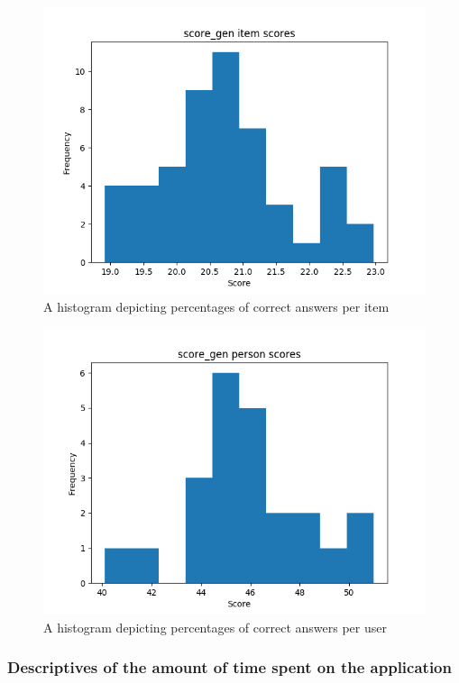\begin{figure}
\includegraphics[width=\textwidth]{img/score_gen_diff.png}
    \caption{A histogram depicting percentages of correct answers per item}
    \label{fig:score_gen_diff}
\end{figure}
\begin{figure}
    \includegraphics[width=\textwidth]{img/score_gen_abil.png}
    \caption{A histogram depicting percentages of correct answers per user}
    \label{fig:score_gen_abil}
\end{figure}

\FloatBarrier
\subsubsection{Descriptives of the amount of time spent on the application}

